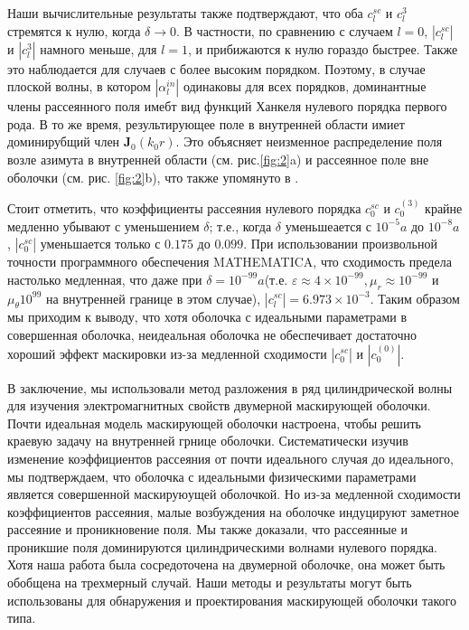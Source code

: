 \documentclass[a4paper, 12pt]{article}
\begin{document}
Наши вычислительные результаты также подтверждают, что оба $c_l^{sc}$ и $c_l^3$ стремятся к нулю, когда $\delta \to 0$.
В частности, по сравнению с случаем $l=0$, $|c_l^{sc}|$ и $|c_l^3|$ намного меньше, для $l=1$, и прибижаются к нулю гораздо
быстрее. Также это наблюдается для случаев с более высоким порядком. Поэтому, в случае плоской волны, в котором 
$|\alpha_l^{in}|$ одинаковы для всех порядков, доминантные члены рассеянного поля имебт вид функций Ханкеля нулевого 
порядка первого рода. В то же время, результирующее поле в внутренней области имиет доминирубщий член $\mathbf{J}_0(k_0r)$.
Это объясняет неизменное распределение поля возле азимута в внутренней области (см. рис.\ref{fig:2}a) и рассеянное поле 
вне оболочки (см. рис. \ref{fig:2}b), что также упомянуто в \cite{6}.

Стоит отметить, что коэффициенты рассеяния нулевого порядка $c_0^{sc}$ и $c_0^{(3)}$ крайне медленно убывают с уменьшением
$\delta$; т.е., когда $\delta$ уменьшеается с $10^{-5}a$ до $10^{-8}a$, $|c_0^{sc}|$ уменьшается только с $0.175$ до 
$0.099$. При использовании произвольной точности программного обеспечения MATHEMATICA, что сходимость предела настолько
медленная, что даже при $\delta = 10^{-99}a$(т.е. $\varepsilon \approx 4 \times 10^{-99}, \mu_r \approx 10^{-99}$ и 
$\mu_\theta 10^{99}$ на внутренней границе в этом случае), $|c_l^{sc}| = 6.973 \times 10^{-3}$. Таким образом мы приходим
к выводу, что хотя оболочка с идеальными параметрами в \cite{1} совершенная оболочка, неидеальная оболочка не обеспечивает
достаточно хороший эффект маскировки из-за медленной сходимости $|c_0^{sc}|$ и $|c_0^{(0)}|$.

В заключение, мы использовали метод разложения в ряд цилиндрической волны для изучения электромагнитных свойств двумерной
маскирующей оболочки. Почти идеальная модель маскирующей оболочки настроена, чтобы решить краевую задачу на внутренней
грнице оболочки. Систематически изучив изменение коэффициентов рассеяния от почти идеального случая до идеального, мы
подтверждаем, что оболочка с идеальными физическими параметрами является совершенной маскируюущей оболочкой. Но из-за
медленной сходимости коэффициентов рассеяния, малые возбуждения на оболочке индуцируют заметное рассеяние и проникновение
поля. Мы также доказали, что рассеянные и проникшие поля доминируются цилиндрическими волнами нулевого порядка. Хотя
наша работа была сосредоточена на двумерной оболочке, она может быть обобщена на трехмерный случай. Наши методы и 
результаты могут быть использованы для обнаружения и проектирования маскирующей оболочки такого типа.
\end{document}
